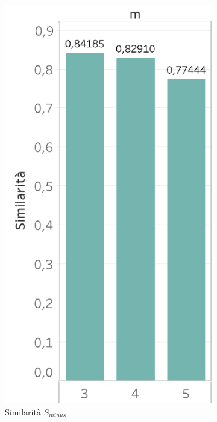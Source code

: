 \begin{figure}
  \centering
   \begin{subfigure}{.5\textwidth}
  \centering
      \includegraphics[scale=0.6]{res/fig/sec-4/scalability/ComparisonMSimilarity.pdf}
  \caption{Similarità \(S_{minus}\)}%
\end{subfigure}%
\begin{subfigure}{.5\textwidth}
  \centering

\end{subfigure}
\end{figure}
